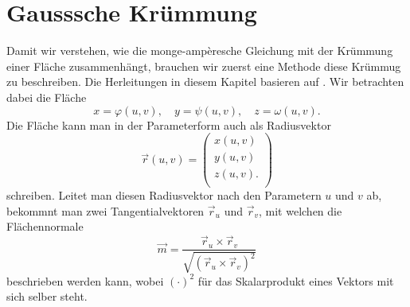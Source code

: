 %
%
%
%
\section{Gausssche Krümmung
\label{mongeampere:section:teil1}}
Damit wir verstehen, wie die monge-ampèresche Gleichung mit der 
Krümmung einer Fläche zusammenhängt, brauchen wir zuerst eine Methode diese 
Krümmug zu beschreiben.
Die Herleitungen in diesem Kapitel basieren auf \cite{mongeampere:smirnow}.
Wir betrachten dabei die Fläche
\begin{equation*}
  x = \varphi(u,v), \quad y = \psi(u,v), \quad z = \omega(u,v).
\end{equation*}
Die Fläche kann man in der Parameterform auch als Radiusvektor
%
\begin{equation*}
  \vec r (u, v) =
  \begin{pmatrix}
    x(u,v) \\
    y(u,v) \\
    z(u,v). \\
  \end{pmatrix}
\end{equation*}
schreiben.
Leitet man diesen Radiusvektor nach den Parametern $u$ und $v$ ab, bekommnt man zwei Tangentialvektoren
$\vec r_u$ und $\vec r_v$,
mit welchen die Flächennormale 
%
\begin{equation}
  \vec m = \frac{\vec r_u \times \vec r_v}{\!\sqrt{(\vec r_u \times \vec r_v)^2}} 
  \label{mongeampere:norm}
\end{equation}
beschrieben werden kann, wobei $(\cdot)^2$ für das Skalarprodukt eines Vektors mit sich selber steht.

